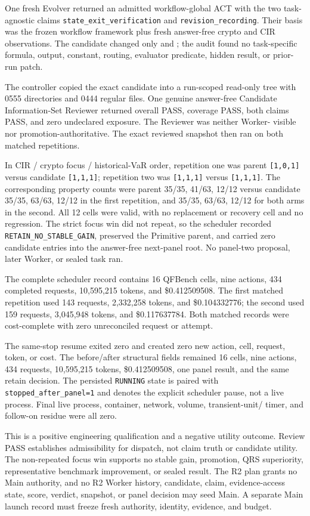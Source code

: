 One fresh Evolver returned an admitted workflow-global ACT with the two
task-agnostic claims \texttt{state\_exit\_verification} and
\texttt{revision\_recording}. Their basis was the frozen workflow framework
plus fresh answer-free crypto and CIR observations. The candidate changed only
 and
; the audit found no task-specific formula, output,
constant, routing, evaluator predicate, hidden result, or prior-run patch.

The controller copied the exact candidate into a run-scoped read-only tree
with 0555 directories and 0444 regular files. One genuine answer-free
Candidate Information-Set Reviewer returned overall PASS, coverage PASS, both
claims PASS, and zero undeclared exposure. The Reviewer was neither Worker-
visible nor promotion-authoritative. The exact reviewed snapshot then ran on
both matched repetitions.

In CIR / crypto focus / historical-VaR order, repetition one was parent
\texttt{[1,0,1]} versus candidate \texttt{[1,1,1]}; repetition two was
\texttt{[1,1,1]} versus \texttt{[1,1,1]}. The corresponding property counts
were parent 35/35, 41/63, 12/12 versus candidate 35/35, 63/63, 12/12 in the
first repetition, and 35/35, 63/63, 12/12 for both arms in the second. All 12
cells were valid, with no replacement or recovery cell and no regression. The
strict focus win did not repeat, so the scheduler recorded
\texttt{RETAIN\_NO\_STABLE\_GAIN}, preserved the Primitive parent, and carried
zero candidate entries into the answer-free next-panel root. No panel-two
proposal, later Worker, or sealed task ran.

The complete scheduler record contains 16 QFBench cells, nine actions, 434
completed requests, 10,595,215 tokens, and \$0.412509508. The first matched
repetition used 143 requests, 2,332,258 tokens, and \$0.104332776; the second
used 159 requests, 3,045,948 tokens, and \$0.117637784. Both matched records
were cost-complete with zero unreconciled request or attempt.

The same-stop resume exited zero and created zero new action, cell, request,
token, or cost. The before/after structural fields remained 16 cells, nine
actions, 434 requests, 10,595,215 tokens, \$0.412509508, one panel result, and
the same retain decision. The persisted \texttt{RUNNING} state is paired with
\texttt{stopped\_after\_panel=1} and denotes the explicit scheduler pause, not
a live process. Final live process, container, network, volume, transient-unit/
timer, and follow-on residue were all zero.

This is a positive engineering qualification and a negative utility outcome.
Review PASS establishes admissibility for dispatch, not claim truth or
candidate utility. The non-repeated focus win supports no stable gain,
promotion, QRS superiority, representative benchmark improvement, or sealed
result. The R2 plan grants no Main authority, and no R2 Worker history,
candidate, claim, evidence-access state, score, verdict, snapshot, or panel
decision may seed Main. A separate Main launch record must freeze fresh
authority, identity, evidence, and budget.
